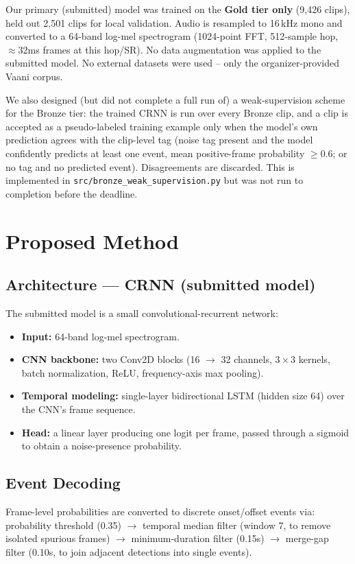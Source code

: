 \documentclass[conference]{IEEEtran}
\begin{document}
Our primary (submitted) model was trained on the \textbf{Gold tier only}
(9{,}426 clips), held out 2{,}501 clips for local validation. Audio is
resampled to 16\,kHz mono and converted to a 64-band log-mel spectrogram
(1024-point FFT, 512-sample hop, $\approx$32ms frames at this hop/SR). No
data augmentation was applied to the submitted model. No external datasets
were used -- only the organizer-provided Vaani corpus.

We also designed (but did not complete a full run of) a weak-supervision
scheme for the Bronze tier: the trained CRNN is run over every Bronze clip,
and a clip is accepted as a pseudo-labeled training example only when the
model's own prediction agrees with the clip-level tag (noise tag present and
the model confidently predicts at least one event, mean positive-frame
probability $\geq 0.6$; or no tag and no predicted event). Disagreements are
discarded. This is implemented in \texttt{src/bronze\_weak\_supervision.py}
but was not run to completion before the deadline.

\section{Proposed Method}

\subsection{Architecture — CRNN (submitted model)}
The submitted model is a small convolutional-recurrent network:
\begin{itemize}
    \item \textbf{Input:} 64-band log-mel spectrogram.
    \item \textbf{CNN backbone:} two Conv2D blocks (16 $\to$ 32 channels,
          $3\times3$ kernels, batch normalization, ReLU, frequency-axis max
          pooling).
    \item \textbf{Temporal modeling:} single-layer bidirectional LSTM
          (hidden size 64) over the CNN's frame sequence.
    \item \textbf{Head:} a linear layer producing one logit per frame,
          passed through a sigmoid to obtain a noise-presence probability.
\end{itemize}

\subsection{Event Decoding}
Frame-level probabilities are converted to discrete onset/offset events via:
probability threshold (0.35) $\rightarrow$ temporal median filter (window 7,
to remove isolated spurious frames) $\rightarrow$ minimum-duration filter
(0.15s) $\rightarrow$ merge-gap filter (0.10s, to join adjacent detections
into single events).
\end{document}
